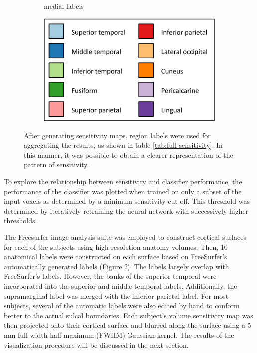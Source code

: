 \documentclass[5p,authoryear]{elsarticle}
\begin{document}
\begin{figure}
\begin{subfigure}{0.3\textwidth}
\caption{medial labels}
\label{fig:medial-labels}
\end{subfigure}
\begin{subfigure}{0.3\textwidth}
\centering
\includegraphics[width=\textwidth]{figures/sensitivity-legend-crop}
\end{subfigure}
\caption{After generating sensitivity maps, region labels were used for aggregating the results, as shown in table \ref{tab:full-sensitivity}. In this manner, it was possible to obtain a clearer representation of the pattern of sensitivity.}
\label{fig:labels}
\end{figure}

To  explore the relationship between sensitivity and classifier performance, the performance of the classifier was plotted when trained on only a subset of the input voxels as determined by a minimum-sensitivity cut off.
This threshold was determined by iteratively retraining the neural network with successively higher thresholds.

The Freesurfer image analysis suite was employed to construct cortical surfaces for each of the subjects using high-resolution anatomy volumes.
Then, 10 anatomical labels were constructed on each surface based on FreeSurfer's automatically generated labels (Figure \ref{fig:labels}).
The labels largely overlap with FreeSurfer's labels.
However, the banks of the superior temporal were incorporated into the superior and middle temporal labels.
Additionally, the supramarginal label was merged with the inferior parietal label.
For most subjects, several of the automatic labels were also edited by hand to conform better to the actual sulcal boundaries.
Each subject's volume sensitivity map was then projected onto their cortical surface and blurred along the surface using a 5 mm full-width half-maximum (FWHM) Gaussian kernel.
The results of the visualization procedure will be discussed in the next section.
\end{document}
